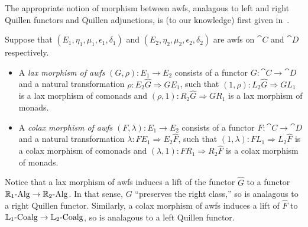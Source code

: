 The appropriate notion of morphism between awfs, analagous to left and right Quillen functors and Quillen adjunctions, is (to our knowledge) first given in~\cite{riehl:nwfs-model}.

\begin{definition}
	Suppose that $(E_1,\eta_1,\mu_1,\epsilon_1,\delta_1)$ and $(E_2,\eta_2,\mu_2,\epsilon_2,\delta_2)$ are awfs on $\cat{C}$ and $\cat{D}$ respectively. 
	\begin{itemize}
		\item A \emph{lax morphism of awfs} $(G,\rho)\colon E_1\to E_2$ consists of a functor $G\colon\cat{C}\to\cat{D}$ and a natural transformation $\rho\colon E_2\hat{G}\Rightarrow GE_1$, such that $(1,\rho)\colon L_2\hat{G}\Rightarrow GL_1$ is a lax morphism of comonads and $(\rho,1)\colon R_2\hat{G}\Rightarrow GR_1$ is a lax morphism of monads.
		\item A \emph{colax morphism of awfs} $(F,\lambda)\colon E_1\to E_2$ consists of a functor $F\colon\cat{C}\to\cat{D}$ and a natural transformation $\lambda\colon FE_1\Rightarrow E_2\hat{F}$, such that $(1,\lambda)\colon FL_1\Rightarrow L_2\hat{F}$ is a colax morphism of comonads and $(\lambda,1)\colon FR_1\Rightarrow R_2\hat{F}$ is a colax morphism of monads.
	\end{itemize}
\end{definition}

Notice that a lax morphism of awfs induces a lift of the functor $\hat{G}$ to a functor $\RAlg[1]\to\RAlg[2]$. In that sense, $G$ ``preserves the right class,'' so is analagous to a right Quillen functor. Similarly, a colax morphism of awfs induces a lift of $\hat{F}$ to $\LCoalg[1]\to\LCoalg[2]$, so is analagous to a left Quillen functor.

